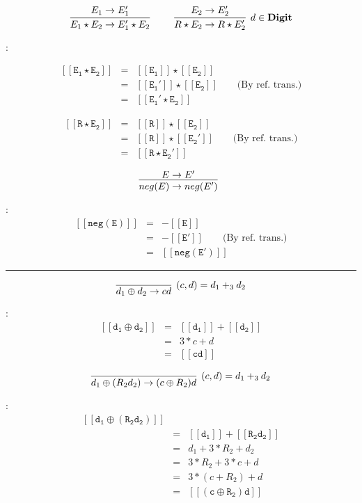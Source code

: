 \documentclass[a4paper,10pt]{article}
\newcommand{\Digit}{\mathbf{Digit}}
\newcommand{\denot}[1]{\mathtt{[[{#1}]]}}
\begin{document}
\begin{enumerate}
\[
\infer[]
  {E_{1} \star E_{2} \rightarrow E_{1}' \star E_{2}}
  {E_{1} \rightarrow E_{1}'} \qquad
\infer[d \in \Digit]
  {R \star E_{2} \rightarrow R \star E_{2}'}
  {E_{2} \rightarrow E_{2}'}
\]

\proof:

\begin{eqnarray*}
\denot{E_{1} \star E_{2}}  
            & = &  \denot{E_{1}} \star \denot{E_{2}} \\
            & = &  \denot{E_{1}'} \star \denot{E_{2}} \qquad \text{(By ref. trans.)}\\  
            & = & \denot{E_{1}' \star E_{2}} 
\end{eqnarray*}


\begin{eqnarray*}
\denot{R \star E_{2}}  
            & = &  \denot{R} \star \denot{E_{2}} \\
            & = &  \denot{R} \star \denot{E_{2}'} \qquad \text{(By ref. trans.)}\\  
            & = & \denot{{R} \star E_{2}'} 
\end{eqnarray*}

\[
\infer[]
  {neg(E) \rightarrow neg(E')}
  {E \rightarrow E'}
\]

\proof:
\begin{eqnarray*}
\denot{neg(E)}  
            & = &  -\denot{E} \\
            & = &  -\denot{E'}  \qquad \text{(By ref. trans.)} \\
            & = & \denot{neg(E')} 
\end{eqnarray*}

\hrule

\[
\infer[(c, d) = d_{1} +_3 d_{2}] 
  {d_{1} \oplus d_{2} \rightarrow cd}
  {}  
\]

\proof:
\begin{eqnarray*}
\denot{d_{1} \oplus d_{2}}  
            & = & \denot{d_{1}} + \denot{d_{2}} \\
            & = & 3 * c + d  \\            
            & = & \denot{cd} 
\end{eqnarray*}

\[
\infer[(c, d) = d_{1} +_3 d_{2}] 
  {d_{1} \oplus (R_{2} d_{2}) \rightarrow (c \oplus R_{2}) d}
  {}  
\]

\proof:
\begin{eqnarray*}
\denot{d_{1} \oplus (R_{2} d_{2})}  \\
            & = & \denot{d_{1}} + \denot{R_{2} d_{2}} \\
            & = & d_{1} + 3 * R_{2} + d_{2} \\
            & = & 3 * R_{2} +  3 * c + d \\
            & = & 3 * (c + R_{2}) + d \\
            & = & \denot{(c \oplus R_{2}) d}       
\end{eqnarray*}


\end{enumerate}
\end{document}
